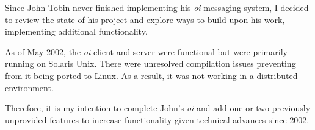 
Since John Tobin never finished implementing his \emph{oi} messaging
system, I decided to review the state of his project and explore ways to
build upon his work, implementing additional functionality.


As of May 2002, the \emph{oi} client and server were functional but
were primarily running on Solaris Unix. There were unresolved
compilation issues preventing from it being ported to Linux. As a 
result, it was not working in a distributed environment.


Therefore, it is my intention to complete John's \emph{oi} and add one
or two previously unprovided features to increase functionality
given technical advances since 2002.
